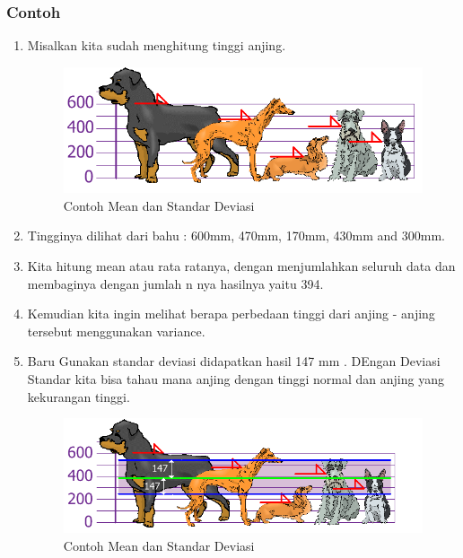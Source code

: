 \subsubsection{Contoh}
\begin{enumerate}
\item Misalkan kita sudah menghitung tinggi anjing.
\begin{figure}[ht]
\centering
\includegraphics[scale=0.5]{figures/chapter5tasya1.png}
\caption{Contoh Mean dan Standar Deviasi }
\label{Teori}
\end{figure}
\item Tingginya dilihat dari bahu : 600mm, 470mm, 170mm, 430mm and 300mm.
\item Kita hitung mean atau rata ratanya, dengan menjumlahkan seluruh data dan membaginya dengan jumlah n nya hasilnya yaitu 394.
\item Kemudian kita ingin melihat berapa perbedaan tinggi dari anjing - anjing tersebut menggunakan variance. 
\item Baru Gunakan standar deviasi didapatkan hasil 147 mm . DEngan Deviasi Standar kita bisa tahau mana anjing dengan tinggi normal dan anjing yang kekurangan tinggi.
\begin{figure}[ht]
\centering
\includegraphics[scale=0.5]{figures/chapter5tasya2.png}
\caption{Contoh Mean dan Standar Deviasi }
\label{Teori}
\end{figure}


\end{enumerate}
